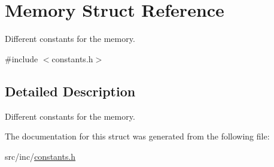 \hypertarget{struct_memory}{}\section{Memory Struct Reference}
\label{struct_memory}


Different constants for the memory.  




{\ttfamily \#include $<$constants.\+h$>$}



\subsection{Detailed Description}
Different constants for the memory. 

The documentation for this struct was generated from the following file\+:\begin{DoxyCompactItemize}
\item 
src/inc/\mbox{\hyperlink{constants_8h}{constants.\+h}}\end{DoxyCompactItemize}
